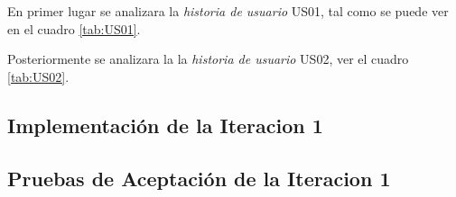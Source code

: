 

En primer lugar se analizara la \emph{historia de usuario} US01, tal como se puede ver en el cuadro \ref{tab:US01}.

  

    


Posteriormente se analizara la la \emph{historia de usuario} US02, ver el cuadro \ref{tab:US02}.

  

    


\subsection{Implementación de la Iteracion 1}

    

\subsection{Pruebas de Aceptación de la Iteracion 1}




